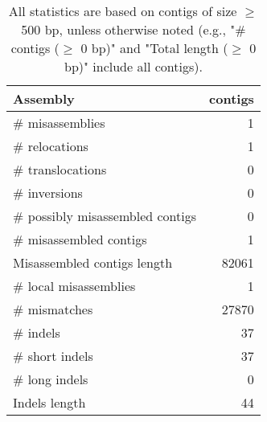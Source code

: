 \documentclass[12pt,a4paper]{article}
\begin{document}
\begin{table}[ht]
\begin{center}
\caption{All statistics are based on contigs of size $\geq$ 500 bp, unless otherwise noted (e.g., "\# contigs ($\geq$ 0 bp)" and "Total length ($\geq$ 0 bp)" include all contigs).}
\begin{tabular}{|l*{1}{|r}|}
\hline
Assembly & contigs \\ \hline
\# misassemblies & 1 \\ \hline
\hspace{5mm}\# relocations & 1 \\ \hline
\hspace{5mm}\# translocations & 0 \\ \hline
\hspace{5mm}\# inversions & 0 \\ \hline
\# possibly misassembled contigs & 0 \\ \hline
\# misassembled contigs & 1 \\ \hline
Misassembled contigs length & 82061 \\ \hline
\# local misassemblies & 1 \\ \hline
\# mismatches & 27870 \\ \hline
\# indels & 37 \\ \hline
\hspace{5mm}\# short indels & 37 \\ \hline
\hspace{5mm}\# long indels & 0 \\ \hline
Indels length & 44 \\ \hline
\end{tabular}
\end{center}
\end{table}
\end{document}

